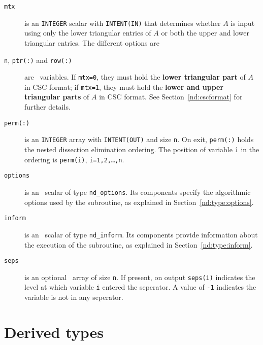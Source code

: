 \noindent
\begin{description}

\item[\texttt{mtx}] is an {\tt INTEGER} scalar with {\tt INTENT(IN)} that 
determines whether $A$ is input using only the lower triangular entries 
of $A$ or both the upper and lower triangular entries. The different options are 

\item[\texttt{n}, \texttt{ptr(:)} and \texttt{row(:)}] are \intentin\ variables. 
If {\tt mtx=0}, they must hold the \textbf{lower triangular part} of 
$A$ in CSC format;  if {\tt mtx=1}, they 
must hold the \textbf{lower and upper triangular parts} of $A$ in CSC format. 
See Section~\ref{nd:cscformat} for further details.

\item[\texttt{perm(:)}] is an {\tt INTEGER} array with {\tt INTENT(OUT)} and size
{\tt n}.  On exit, {\tt perm(:)} holds the nested dissection elimination ordering. 
The position of variable {\tt i} in the ordering is  {\tt perm(i)},
{\tt i=1,2,\ldots,n}.

\item[\texttt{options}] is an \intentin\ scalar of type {\tt nd\_options}.
Its components specify the algorithmic options used by the subroutine, as
explained in Section~\ref{nd:type:options}.

\item[\texttt{inform}] is an \intentout\ scalar of type
{\tt nd\_inform}. Its components provide information about the execution
of the subroutine, as explained in Section~\ref{nd:type:inform}.

\item[\texttt{seps}] is an optional \intentout\ array of size \texttt{n}. If
present, on output \texttt{seps(i)} indicates the level at which variable
\texttt{i} entered the seperator. A value of \texttt{-1} indicates the variable
is not in any seperator.


\end{description}




\section{Derived types}
